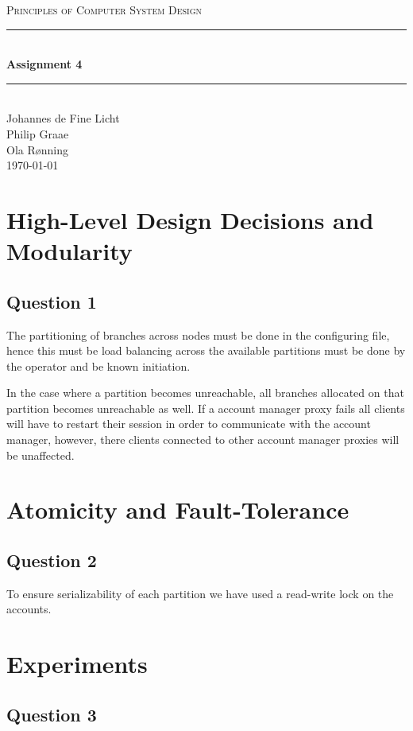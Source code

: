 \documentclass[12pt]{article}
\newcommand{\HRule}{\rule{\linewidth}{0.5mm}}
\begin{document}
\begin{center}
\textsc{\LARGE Principles of Computer System Design}\\[0.3cm] %
\HRule \\[0.4cm]
{ \huge \bfseries Assignment 4}
\HRule \\[0.4cm]
\large
Johannes de Fine Licht
\\Philip Graae
\\Ola Rønning
\\\today
\end{center}

\section*{High-Level Design Decisions and Modularity}

\subsection*{Question 1}
The partitioning of branches across nodes must be done in the configuring file, hence this must be load balancing across the available partitions must be done by the operator and be known initiation.

In the case where a partition becomes unreachable, all branches allocated on that partition becomes unreachable as well. If a account manager proxy fails all clients will have to restart their session in order to communicate with the account manager, however, there clients connected to other account manager proxies will be unaffected.
\section*{Atomicity and Fault-Tolerance}

\subsection*{Question 2}
To ensure serializability of each partition we have used a read-write lock on the accounts. 
\section*{Experiments}

\subsection*{Question 3}
\end{document}
